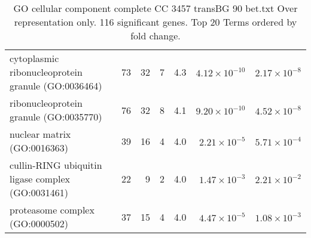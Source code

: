 \begin{table}[ht]
\begin{adjustbox}{width=\textwidth}
\begin{tabular}{lrrrrrr}
  cytoplasmic ribonucleoprotein granule (GO:0036464) & 73 & 32 & 7 & 4.3 & $4.12 \times 10^{-10}$ & $2.17 \times 10^{-8}$ \\ 
  ribonucleoprotein granule (GO:0035770) & 76 & 32 & 8 & 4.1 & $9.20 \times 10^{-10}$ & $4.52 \times 10^{-8}$ \\ 
  nuclear matrix (GO:0016363) & 39 & 16 & 4 & 4.0 & $2.21 \times 10^{-5}$ & $5.71 \times 10^{-4}$ \\ 
  cullin-RING ubiquitin ligase complex (GO:0031461) & 22 & 9 & 2 & 4.0 & $1.47 \times 10^{-3}$ & $2.21 \times 10^{-2}$ \\ 
  proteasome complex (GO:0000502) & 37 & 15 & 4 & 4.0 & $4.47 \times 10^{-5}$ & $1.08 \times 10^{-3}$ \\ 
   \hline
\end{tabular}
\end{adjustbox}
\caption{GO cellular component complete CC 3457 transBG 90 bet.txt Over representation only. 116 significant genes. Top 20 Terms ordered by fold change. } 
\label{tab:GO cellular component complete CC 3457 transBG 90 bet.txt Over representation only. 116 significant genes. Top 20 Terms ordered by fold change. }
\end{table}


